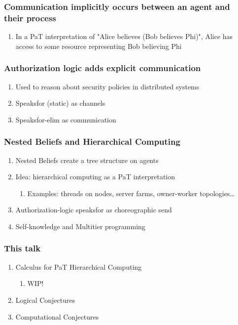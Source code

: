 \documentclass[11pt]{article}
\begin{document}
\subsubsection{Communication implicitly occurs between an agent and their process}
\label{sec:org0bd14d2}
\begin{enumerate}
\item In a PaT interpretation of "Alice believes (Bob believes Phi)", Alice has access to some resource representing Bob believing Phi
\label{sec:orgbc70f9a}
\end{enumerate}
\subsubsection{Authorization logic adds explicit communication}
\label{sec:orga27cc97}
\begin{enumerate}
\item Used to reason about security policies in distributed systems
\label{sec:org679550b}
\item Speaksfor (static) as channels
\label{sec:org23e82a9}
\item Speaksfor-elim as communication
\label{sec:org359d568}
\end{enumerate}
\subsubsection{Nested Beliefs and Hierarchical Computing}
\label{sec:orga24f921}
\begin{enumerate}
\item Nested Beliefs create a tree structure on agents
\label{sec:org2c35dfc}
\item Idea: hierarchical computing as a PaT interpretation
\label{sec:org069d876}
\begin{enumerate}
\item Examples: threads on nodes, server farms, owner-worker topologies\ldots{}
\label{sec:org2da5da2}
\end{enumerate}
\item Authorization-logic speaksfor as choreographic send
\label{sec:org9df3657}
\item Self-knowledge and Multitier programming
\label{sec:org0f03057}
\end{enumerate}
\subsubsection{This talk}
\label{sec:orgea924b7}
\begin{enumerate}
\item Calculus for PaT Hierarchical Computing
\label{sec:org95633c5}
\begin{enumerate}
\item WIP!
\label{sec:org83cf4e5}
\end{enumerate}
\item Logical Conjectures
\label{sec:org1bb92df}
\item Computational Conjectures
\label{sec:orgb48dbd2}
\end{enumerate}
\end{document}
